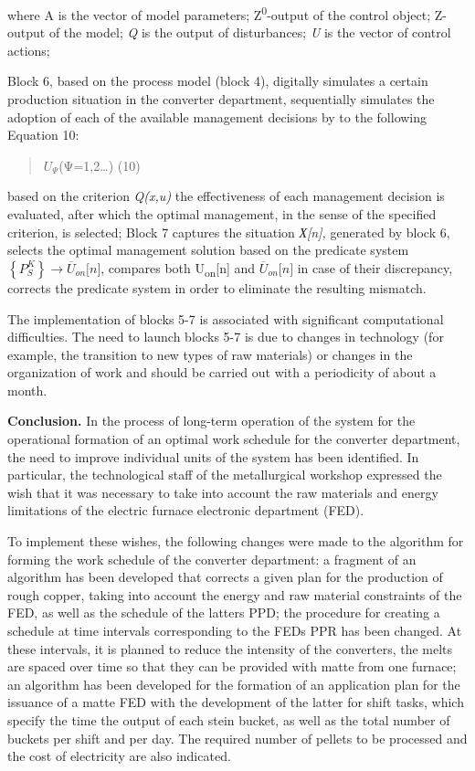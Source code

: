 where A is the vector of model parameters; Z\textsuperscript{0}-output
of the control object; Z- output of the model; \emph{Q} is the output of
disturbances; \emph{U} is the vector of control actions;

Block 6, based on the process model (block 4), digitally simulates a
certain production situation in the converter department, sequentially
simulates the adoption of each of the available management decisions by
to the following Equation 10:

\begin{quote}
\(U_{\Psi}\)(Ψ=1,2\ldots) (10)
\end{quote}

based on the criterion \emph{Q(x,u)} the effectiveness of each
management decision is evaluated, after which the optimal management, in
the sense of the specified criterion, is selected; Block 7 captures the
situation \emph{Х{[}n{]},} generated by block 6, selects the optimal
management solution based on the predicate system
\(\left\{ P_{S}^{K} \right\} \rightarrow {\overline{U}}_{on}\lbrack n\rbrack\),
compares both U\textsubscript{on}{[}n{]} and
\({\overline{U}}_{on}\lbrack n\rbrack\) in case of their discrepancy,
corrects the predicate system in order to eliminate the resulting
mismatch.

The implementation of blocks 5-7 is associated with significant
computational difficulties. The need to launch blocks 5-7 is due to
changes in technology (for example, the transition to new types of raw
materials) or changes in the organization of work and should be carried
out with a periodicity of about a month.

{\bfseries Conclusion.} In the process of long-term operation of the system
for the operational formation of an optimal work schedule for the
converter department, the need to improve individual units of the system
has been identified. In particular, the technological staff of the
metallurgical workshop expressed the wish that it was necessary to take
into account the raw materials and energy limitations of the electric
furnace electronic department (FED).

To implement these wishes, the following changes were made to the
algorithm for forming the work schedule of the converter department: a
fragment of an algorithm has been developed that corrects a given plan
for the production of rough copper, taking into account the energy and
raw material constraints of the FED, as well as the schedule of the
latter\textquotesingle s PPD; the procedure for creating a schedule at
time intervals corresponding to the FED\textquotesingle s PPR has been
changed. At these intervals, it is planned to reduce the intensity of
the converters, the melts are spaced over time so that they can be
provided with matte from one furnace; an algorithm has been developed
for the formation of an application plan for the issuance of a matte FED
with the development of the latter for shift tasks, which specify the
time the output of each stein bucket, as well as the total number of
buckets per shift and per day. The required number of pellets to be
processed and the cost of electricity are also indicated.

